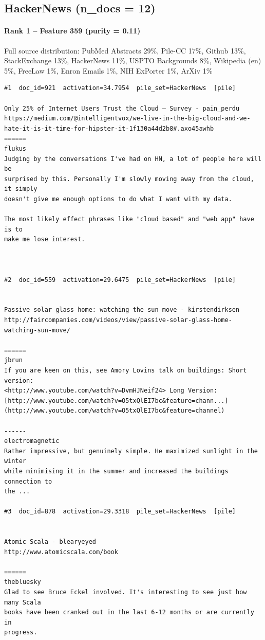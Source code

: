 \subsection*{HackerNews (n\_docs = 12)}

\paragraph*{Rank 1 -- Feature 359 (purity = 0.11)}

Full source distribution: PubMed Abstracts 29\%, Pile-CC 17\%, Github 13\%, StackExchange 13\%, HackerNews 11\%, USPTO Backgrounds 8\%, Wikipedia (en) 5\%, FreeLaw 1\%, Enron Emails 1\%, NIH ExPorter 1\%, ArXiv 1\%

\begin{verbatim}
#1  doc_id=921  activation=34.7954  pile_set=HackerNews  [pile]

Only 25% of Internet Users Trust the Cloud – Survey - pain_perdu
https://medium.com/@intelligentvox/we-live-in-the-big-cloud-and-we-hate-it-is-it-time-for-hipster-it-1f130a44d2b8#.axo45awhb
======
flukus
Judging by the conversations I've had on HN, a lot of people here will be
surprised by this. Personally I'm slowly moving away from the cloud, it simply
doesn't give me enough options to do what I want with my data.

The most likely effect phrases like "cloud based" and "web app" have is to
make me lose interest.



#2  doc_id=559  activation=29.6475  pile_set=HackerNews  [pile]


Passive solar glass home: watching the sun move - kirstendirksen
http://faircompanies.com/videos/view/passive-solar-glass-home-watching-sun-move/

======
jbrun
If you are keen on this, see Amory Lovins talk on buildings: Short version:
<http://www.youtube.com/watch?v=DvmHJNeif24> Long Version:
[http://www.youtube.com/watch?v=O5txQlEI7bc&feature=chann...](http://www.youtube.com/watch?v=O5txQlEI7bc&feature=channel)

------
electromagnetic
Rather impressive, but genuinely simple. He maximized sunlight in the winter
while minimising it in the summer and increased the buildings connection to
the ...

#3  doc_id=878  activation=29.3318  pile_set=HackerNews  [pile]


Atomic Scala - blearyeyed
http://www.atomicscala.com/book

======
thebluesky
Glad to see Bruce Eckel involved. It's interesting to see just how many Scala
books have been cranked out in the last 6-12 months or are currently in
progress.


\end{verbatim}
